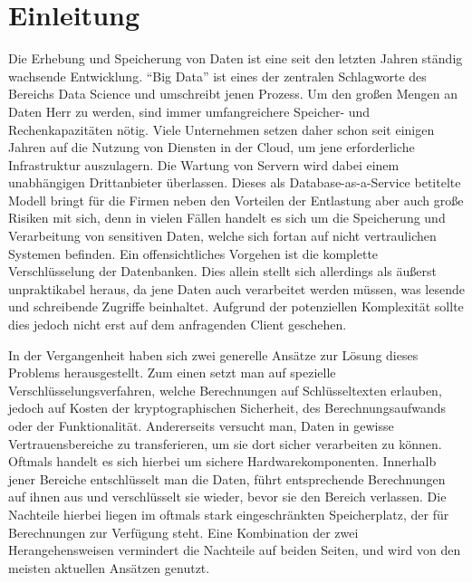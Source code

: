 
\chapter{Einleitung}

Die Erhebung und Speicherung von Daten ist eine seit den letzten Jahren ständig wachsende Entwicklung. "`Big Data"' ist eines der zentralen Schlagworte des Bereichs Data Science und umschreibt jenen Prozess. Um den großen Mengen an Daten Herr zu werden, sind immer umfangreichere Speicher- und Rechenkapazitäten nötig. Viele Unternehmen setzen daher schon seit einigen Jahren auf die Nutzung von Diensten in der Cloud, um jene erforderliche Infrastruktur auszulagern. Die Wartung von Servern wird dabei einem unabhängigen Drittanbieter überlassen. Dieses als Database-as-a-Service betitelte Modell bringt für die Firmen neben den Vorteilen der Entlastung aber auch große Risiken mit sich, denn in vielen Fällen handelt es sich um die Speicherung und Verarbeitung von sensitiven Daten, welche sich fortan auf nicht vertraulichen Systemen befinden. Ein offensichtliches Vorgehen ist die komplette Verschlüsselung der Datenbanken. Dies allein stellt sich allerdings als äußerst unpraktikabel heraus, da jene Daten auch verarbeitet werden müssen, was lesende und schreibende Zugriffe beinhaltet. Aufgrund der potenziellen Komplexität sollte dies jedoch nicht erst auf dem anfragenden Client geschehen.

In der Vergangenheit haben sich zwei generelle Ansätze zur Lösung dieses Problems herausgestellt. Zum einen setzt man auf spezielle Verschlüsselungsverfahren, welche Berechnungen auf Schlüsseltexten erlauben, jedoch auf Kosten der kryptographischen Sicherheit, des Berechnungsaufwands oder der Funktionalität. Andererseits versucht man, Daten in gewisse Vertrauensbereiche zu transferieren, um sie dort sicher verarbeiten zu können. Oftmals handelt es sich hierbei um sichere Hardwarekomponenten. Innerhalb jener Bereiche entschlüsselt man die Daten, führt entsprechende Berechnungen auf ihnen aus und verschlüsselt sie wieder, bevor sie den Bereich verlassen. Die Nachteile hierbei liegen im oftmals stark eingeschränkten Speicherplatz, der für Berechnungen zur Verfügung steht. Eine Kombination der zwei Herangehensweisen vermindert die Nachteile auf beiden Seiten, und wird von den meisten aktuellen Ansätzen genutzt.
 
